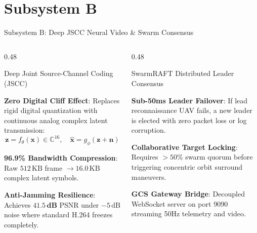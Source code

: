 \documentclass[aspectratio=169, 10pt]{beamer}
\begin{document}
\section{Subsystem B}
\begin{frame}{Subsystem B: Deep JSCC Neural Video \& Swarm Consensus}
  \begin{columns}[T]
    \begin{column}{0.48\textwidth}
      \begin{highlightcard}{Deep Joint Source-Channel Coding (JSCC)}
        \begin{itemize}\setlength{\itemsep}{3pt}
          {\tiny
            \item \textbf{Zero Digital Cliff Effect}: Replaces rigid digital quantization with continuous analog complex latent transmission:
            $$\mathbf{z} = f_{\theta}(\mathbf{x}) \in \mathbb{C}^{16}, \quad \hat{\mathbf{x}} = g_{\phi}(\mathbf{z} + \mathbf{n})$$
            \item \textbf{96.9\% Bandwidth Compression}: Raw $512\,\text{KB}$ frame $\to 16.0\,\text{KB}$ complex latent symbols.
            \item \textbf{Anti-Jamming Resilience}: Achieves $\mathbf{41.5\,\text{dB}}$ PSNR under $-5\,\text{dB}$ noise where standard H.264 freezes completely.
          }
        \end{itemize}
      \end{highlightcard}
    \end{column}

    \begin{column}{0.48\textwidth}
      \begin{defensecard}{SwarmRAFT Distributed Leader Consensus}
        \begin{itemize}\setlength{\itemsep}{3pt}
          {\tiny
            \item \textbf{Sub-50ms Leader Failover}: If lead reconnaissance UAV fails, a new leader is elected with zero packet loss or log corruption.
            \item \textbf{Collaborative Target Locking}: Requires $> 50\%$ swarm quorum before triggering concentric orbit surround maneuvers.
            \item \textbf{GCS Gateway Bridge}: Decoupled WebSocket server on port 9090 streaming 50Hz telemetry and video.
          }
        \end{itemize}
      \end{defensecard}
    \end{column}
  \end{columns}
\end{frame}
\end{document}
